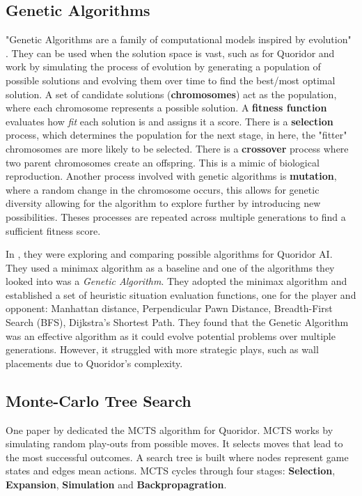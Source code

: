 \documentclass[review]{cmpreport}
\begin{document}
\subsection{Genetic Algorithms}
"Genetic Algorithms are a family of computational models inspired by evolution" \cite{mathew2012genetic}. They can be used when the solution space is vast, such as for Quoridor and work by simulating the process of evolution by generating a population of possible solutions and evolving them over time to find the best/most optimal solution. A set of candidate solutions (\textbf{chromosomes}) act as the population, where each chromosome represents a possible solution. A \textbf{fitness function} evaluates how \textit{fit} each solution is and assigns it a score. There is a \textbf{selection} process, which determines the population for the next stage, in here, the "fitter" chromosomes are more likely to be selected. There is a \textbf{crossover} process where two parent chromosomes create an offspring. This is a mimic of biological reproduction. Another process involved with genetic algorithms is \textbf{mutation}, where a random change in the chromosome occurs, this allows for genetic diversity allowing for the algorithm to explore further by introducing new possibilities. Theses processes are repeated across multiple generations to find a sufficient fitness score.

\noindent In \cite{josequoridor}, they were exploring and comparing possible algorithms for Quoridor AI. They used a minimax algorithm as a baseline and one of the algorithms they looked into was a \textit{Genetic Algorithm}.
They adopted the minimax algorithm and established a set of heuristic situation evaluation functions, one for the player and opponent: Manhattan distance, Perpendicular Pawn Distance, Breadth-First Search (BFS), Dijkstra's Shortest Path. They found that the Genetic Algorithm was an effective algorithm as it could evolve potential problems over multiple generations. However, it struggled with more strategic plays, such as wall placements due to Quoridor's complexity.

\subsection{Monte-Carlo Tree Search}
One paper by \cite{respall2018monte} dedicated the MCTS algorithm for Quoridor. 
MCTS works by simulating random play-outs from possible moves. It selects moves that lead to the most successful outcomes. A search tree is built where nodes represent game states and edges mean actions. MCTS cycles through four stages: \textbf{Selection}, \textbf{Expansion}, \textbf{Simulation} and \textbf{Backpropagration}.
\end{document}

